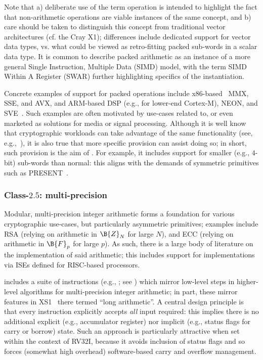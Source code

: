 \noindent
Note that
a) deliberate use of the term operation is intended to highlight the fact 
   that non-arithmetic operations are viable instances of the same concept,
   and
b) care should be taken to distinguish this concept from traditional vector 
   architectures
   (cf. the Cray X1);
   differences include dedicated support for vector data types, vs. what
   could be viewed as retro-fitting packed sub-words in a scalar data type.
It is common to describe packed arithmetic as an instance of a more general
Single Instruction, Multiple Data (SIMD) model, with the term SIMD Within 
A Register (SWAR) further highlighting specifics of the instantiation.

Concrete examples of support for packed operations include
x86-based~\cite[Section 2.2.7]{SCARV:X86:2:18} MMX, SSE, and AVX,
and
ARM-based DSP (e.g., for lower-end Cortex-M), NEON, and SVE~\cite{SCARV:SBBEEGHMMPRRW:17}.
Such examples are often motivated by use-cases related to, or even marketed 
as solutions for media or signal processing.  Although it is well know that
cryptographic workloads can take advantage of the same functionality
(see, e.g.,~\cite{SCARV:Hamburg:09,SCARV:BerSch:12}),
it is also true that more specific provision can assist doing so; in short,
such provision is the aim of \XCID.  For example, it includes support for
smaller (e.g., $4$-bit) sub-words than normal: this aligns with the demands
of symmetric primitives such as PRESENT~\cite{SCARV:BKLPPRSV:07}.


\subsubsection{Class-$2.5$: multi-precision}
\label{sec:bg:feature:2:5}

Modular, multi-precision integer arithmetic forms a foundation for various
cryptographic use-cases, but particularly asymmetric primitives; examples 
include
RSA (relying on arithmetic in $\B{Z}_N$ for large $N$),
and
ECC (relying on arithmetic in $\B{F}_p$ for large $p$).
As such, there is a large body of literature on the implementation of said 
arithmetic; this includes support for implementations via ISEs defined for 
RISC-based processors.

\XCID includes a suite of instructions 
(e.g., ; see )
which mirror low-level steps in higher-level algorithms for multi-precision 
integer arithmetic; in part, these mirror features in 
XS1~\cite[Section 18]{SCARV:XS1:09} 
there termed ``long arithmetic''.  A central design principle is that every
instruction explicitly accepts {\em all} input required: this implies there
is no additional
explicit (e.g., accumulator register) 
nor 
implicit (e.g., status flags for carry or borrow)
state.
Such an approach is particularly attractive when set within the context of 
RV32I, because it avoids inclusion of status flags and so forces (somewhat 
high overhead) software-based carry and overflow management.

